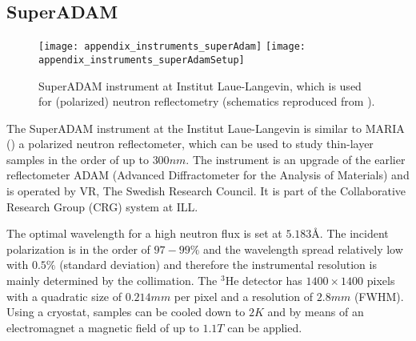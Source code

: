 \documentclass[\main/dresen_thesis.tex]{subfiles}
\begin{document}
  \subsection{SuperADAM}\label{ch:lss:superadam}
    \begin{figure}[ht]
      \centering
      \texttt{[image: appendix\_instruments\_superAdam]}
      \texttt{[image: appendix\_instruments\_superAdamSetup]}
      \caption{\label{fig:lss:superadam}SuperADAM instrument at Institut Laue-Langevin, which is used for (polarized) neutron reflectometry (schematics reproduced from \cite{Devishvili_2015_Super}).}
    \end{figure}
    The SuperADAM instrument at the Institut Laue-Langevin is similar to MARIA () a polarized neutron reflectometer, which can be used to study thin-layer samples in the order of up to $300 \unit{nm}$.
    The instrument is an upgrade of the earlier reflectometer ADAM (Advanced Diffractometer for the Analysis of Materials) and is operated by VR, The Swedish Research Council.
    It is part of the Collaborative Research Group (CRG) system at ILL.

    The optimal wavelength for a high neutron flux is set at $5.183 \unit{\angstrom}$.
    The incident polarization is in the order of $97 - 99 \unit{\%}$ and the wavelength spread relatively low with $0.5 \unit{\%}$ (standard deviation) and therefore the instrumental resolution is mainly determined by the collimation.
    The $^3\mathrm{He}$ detector has $1400 \times 1400$ pixels with a quadratic size of $0.214 \unit{mm}$ per pixel and a resolution of $2.8 \unit{mm}$ (FWHM).
    Using a cryostat, samples can be cooled down to $2 \unit{K}$ and by means of an electromagnet a magnetic field of up to $1.1 \unit{T}$ can be applied.
\end{document}
